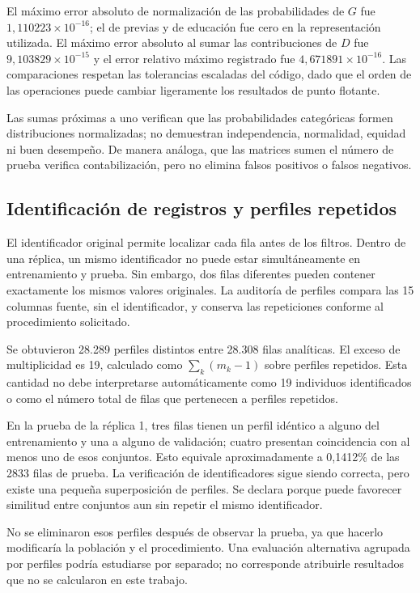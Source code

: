 \documentclass[11pt,a4paper]{article}
\begin{document}
El máximo error absoluto de normalización de las probabilidades de $G$ fue $1,110223\times10^{-16}$; el de previas y de educación fue cero en la representación utilizada. El máximo error absoluto al sumar las contribuciones de $D$ fue $9,103829\times10^{-15}$ y el error relativo máximo registrado fue $4,671891\times10^{-16}$. Las comparaciones respetan las tolerancias escaladas del código, dado que el orden de las operaciones puede cambiar ligeramente los resultados de punto flotante.

Las sumas próximas a uno verifican que las probabilidades categóricas formen distribuciones normalizadas; no demuestran independencia, normalidad, equidad ni buen desempeño. De manera análoga, que las matrices sumen el número de prueba verifica contabilización, pero no elimina falsos positivos o falsos negativos.

\subsection{Identificación de registros y perfiles repetidos}
El identificador original permite localizar cada fila antes de los filtros. Dentro de una réplica, un mismo identificador no puede estar simultáneamente en entrenamiento y prueba. Sin embargo, dos filas diferentes pueden contener exactamente los mismos valores originales. La auditoría de perfiles compara las 15 columnas fuente, sin el identificador, y conserva las repeticiones conforme al procedimiento solicitado.

Se obtuvieron 28.289 perfiles distintos entre 28.308 filas analíticas. El exceso de multiplicidad es 19, calculado como $\sum_k(m_k-1)$ sobre perfiles repetidos. Esta cantidad no debe interpretarse automáticamente como 19 individuos identificados o como el número total de filas que pertenecen a perfiles repetidos.

En la prueba de la réplica 1, tres filas tienen un perfil idéntico a alguno del entrenamiento y una a alguno de validación; cuatro presentan coincidencia con al menos uno de esos conjuntos. Esto equivale aproximadamente a 0,1412\% de las 2833 filas de prueba. La verificación de identificadores sigue siendo correcta, pero existe una pequeña superposición de perfiles. Se declara porque puede favorecer similitud entre conjuntos aun sin repetir el mismo identificador.

No se eliminaron esos perfiles después de observar la prueba, ya que hacerlo modificaría la población y el procedimiento. Una evaluación alternativa agrupada por perfiles podría estudiarse por separado; no corresponde atribuirle resultados que no se calcularon en este trabajo.
\end{document}
